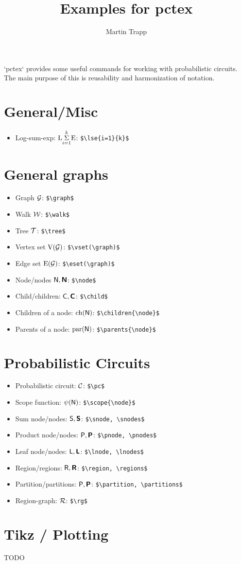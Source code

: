 \documentclass[11pt]{article}
\title{Examples for pctex}
\author{ Martin Trapp }
\date{}
\begin{document}
\maketitle

\noindent
`pctex` provides some useful commands for working with probabilistic circuits. The main purpose of this is reusability and harmonization of notation.

\section{General/Misc}
\begin{itemize}
	\item Log-sum-exp: $\lse{i=1}{k}$: \verb!$\lse{i=1}{k}$!
\end{itemize}

\section{General graphs}
\begin{itemize}
	\item Graph $\graph$: \verb!$\graph$!
	\item Walk $\walk$: \verb!$\walk$!
	\item Tree $\tree$: \verb!$\tree$!
	\item Vertex set $\vset(\graph)$: \verb!$\vset(\graph)$!
	\item Edge set $\eset(\graph)$: \verb!$\eset(\graph)$!
	\item Node/nodes $\node, \nodes$: \verb!$\node$!
	\item Child/children: $\cnode, \cnodes$: \verb!$\child$!
	\item Children of a node: $\children{\node}$: \verb!$\children{\node}$!
	\item Parents of a node: $\parents{\node}$: \verb!$\parents{\node}$!
\end{itemize}

\section{Probabilistic Circuits}
\begin{itemize}
	\item Probabilistic circuit: $\pc$: \verb!$\pc$!
	\item Scope function: $\scope{\node}$: \verb!$\scope{\node}$!
	\item Sum node/nodes: $\snode, \snodes$: \verb!$\snode, \snodes$!
	\item Product node/nodes: $\pnode, \pnodes$: \verb!$\pnode, \pnodes$!
	\item Leaf node/nodes: $\lnode, \lnodes$: \verb!$\lnode, \lnodes$!
	\item Region/regions: $\region, \regions$: \verb!$\region, \regions$!
	\item Partition/partitions: $\partition, \partitions$: \verb!$\partition, \partitions$!
	\item Region-graph: $\rg$: \verb!$\rg$!
\end{itemize}

\section{Tikz / Plotting}
TODO
\end{document}
